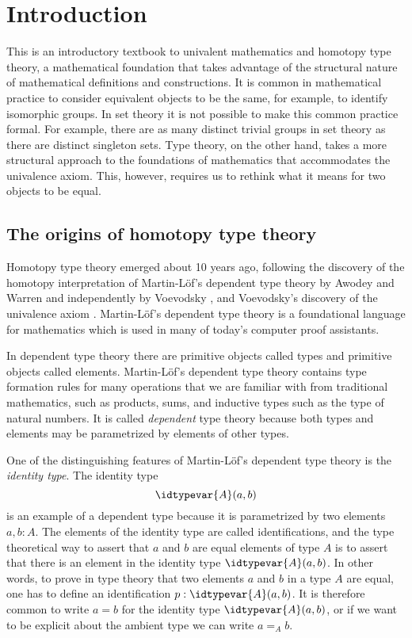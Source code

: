 \chapter*{Introduction}

This is an introductory textbook to univalent mathematics and homotopy type theory, a mathematical foundation that takes advantage of the structural nature of mathematical definitions and constructions. It is common in mathematical practice to consider equivalent objects to be the same, for example, to identify isomorphic groups. In set theory it is not possible to make this common practice formal. For example, there are as many distinct trivial groups in set theory as there are distinct singleton sets. Type theory, on the other hand, takes a more structural approach to the foundations of mathematics that accommodates the univalence axiom. This, however, requires us to rethink what it means for two objects to be equal.

\section*{The origins of homotopy type theory}

Homotopy type theory emerged about 10 years ago, following the discovery of the homotopy interpretation of Martin-L\"of's dependent type theory by Awodey and Warren \cite{AwodeyWarren} and independently by Voevodsky \cite{Voevodsky06}, and Voevodsky's discovery of the univalence axiom \cite{Voevodsky10}. Martin-L\"of's dependent type theory \cite{MartinLof84} is a foundational language for mathematics which is used in many of today's computer proof assistants.

In dependent type theory there are primitive objects called types and primitive objects called elements. Martin-L\"of's dependent type theory contains type formation rules for many operations that we are familiar with from traditional mathematics, such as products, sums, and inductive types such as the type of natural numbers. It is called \emph{dependent} type theory because both types and elements may be parametrized by elements of other types.

One of the distinguishing features of Martin-L\"of's dependent type theory is the \emph{identity type}. The identity type
\begin{equation*}
  \idtypevar{A}(a,b)
\end{equation*}
is an example of a dependent type because it is parametrized by two elements $a,b:A$. The elements of the identity type are called identifications, and the type theoretical way to assert that $a$ and $b$ are equal elements of type $A$ is to assert that there is an element in the identity type $\idtypevar{A}(a,b)$. In other words, to prove in type theory that two elements $a$ and $b$ in a type $A$ are equal, one has to define an identification $p:\idtypevar{A}(a,b)$. It is therefore common to write $a= b$ for the identity type $\idtypevar{A}(a,b)$, or if we want to be explicit about the ambient type we can write $a=_Ab$.

